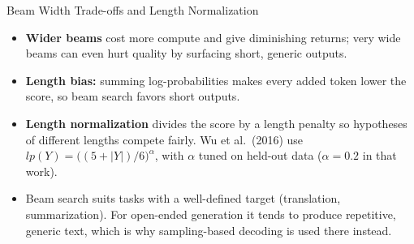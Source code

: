 \begin{frame}{Beam Width Trade-offs and Length Normalization}
  \begin{itemize}
    \item \textbf{Wider beams} cost more compute and give diminishing returns; very wide beams can even hurt quality by surfacing short, generic outputs.
    \item \textbf{Length bias:} summing log-probabilities makes every added token lower the score, so beam search favors short outputs.
    \item \textbf{Length normalization} divides the score by a length penalty so hypotheses of different lengths compete fairly. Wu et al.\ (2016) use $lp(Y) = \big((5 + |Y|)/6\big)^{\alpha}$, with $\alpha$ tuned on held-out data ($\alpha = 0.2$ in that work).
    \item Beam search suits tasks with a well-defined target (translation, summarization). For open-ended generation it tends to produce repetitive, generic text, which is why sampling-based decoding is used there instead.
  \end{itemize}
\end{frame}
